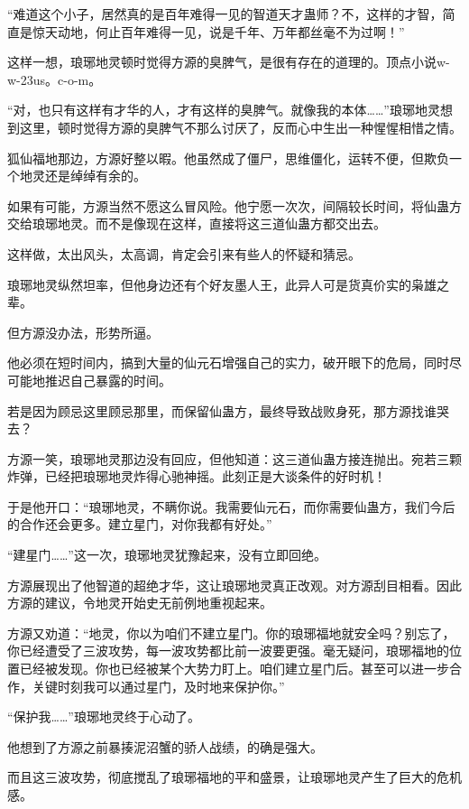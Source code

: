 
\begin{this_body}

“难道这个小子，居然真的是百年难得一见的智道天才蛊师？不，这样的才智，简直是惊天动地，何止百年难得一见，说是千年、万年都丝毫不为过啊！”

这样一想，琅琊地灵顿时觉得方源的臭脾气，是很有存在的道理的。顶点小说w-w-23us。c-o-m。

“对，也只有这样有才华的人，才有这样的臭脾气。就像我的本体……”琅琊地灵想到这里，顿时觉得方源的臭脾气不那么讨厌了，反而心中生出一种惺惺相惜之情。

狐仙福地那边，方源好整以暇。他虽然成了僵尸，思维僵化，运转不便，但欺负一个地灵还是绰绰有余的。

如果有可能，方源当然不愿这么冒风险。他宁愿一次次，间隔较长时间，将仙蛊方交给琅琊地灵。而不是像现在这样，直接将这三道仙蛊方都交出去。

这样做，太出风头，太高调，肯定会引来有些人的怀疑和猜忌。

琅琊地灵纵然坦率，但他身边还有个好友墨人王，此异人可是货真价实的枭雄之辈。

但方源没办法，形势所逼。

他必须在短时间内，搞到大量的仙元石增强自己的实力，破开眼下的危局，同时尽可能地推迟自己暴露的时间。

若是因为顾忌这里顾忌那里，而保留仙蛊方，最终导致战败身死，那方源找谁哭去？

方源一笑，琅琊地灵那边没有回应，但他知道：这三道仙蛊方接连抛出。宛若三颗炸弹，已经把琅琊地灵炸得心驰神摇。此刻正是大谈条件的好时机！

于是他开口：“琅琊地灵，不瞒你说。我需要仙元石，而你需要仙蛊方，我们今后的合作还会更多。建立星门，对你我都有好处。”

“建星门……”这一次，琅琊地灵犹豫起来，没有立即回绝。

方源展现出了他智道的超绝才华，这让琅琊地灵真正改观。对方源刮目相看。因此方源的建议，令地灵开始史无前例地重视起来。

方源又劝道：“地灵，你以为咱们不建立星门。你的琅琊福地就安全吗？别忘了，你已经遭受了三波攻势，每一波攻势都比前一波要更强。毫无疑问，琅琊福地的位置已经被发现。你也已经被某个大势力盯上。咱们建立星门后。甚至可以进一步合作，关键时刻我可以通过星门，及时地来保护你。”

“保护我……”琅琊地灵终于心动了。

他想到了方源之前暴揍泥沼蟹的骄人战绩，的确是强大。

而且这三波攻势，彻底搅乱了琅琊福地的平和盛景，让琅琊地灵产生了巨大的危机感。


\end{this_body}
